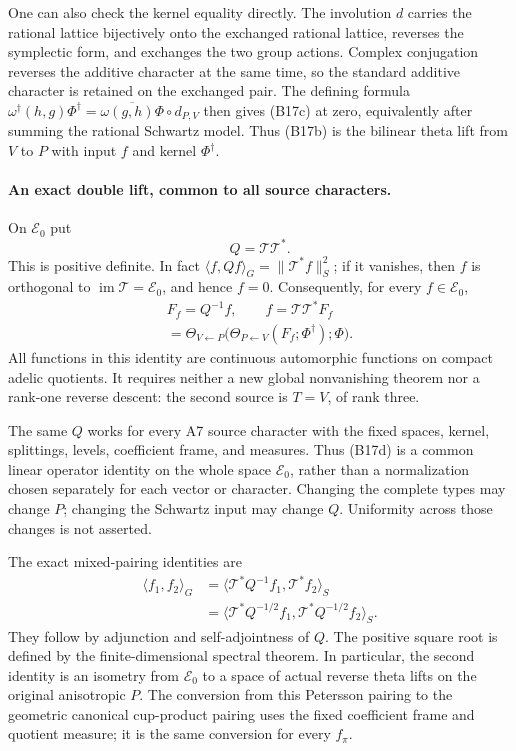 One can also check the kernel equality directly. The involution
$d$ carries the rational lattice bijectively onto the exchanged
rational lattice, reverses the symplectic form, and exchanges
the two group actions. Complex conjugation reverses the additive
character at the same time, so the standard additive character
is retained on the exchanged pair. The defining formula
$\omega^\dagger(h,g)\Phi^\dagger
 =\overline{\omega(g,h)\Phi}\circ d_{P,V}$
then gives (B17c) at zero, equivalently after summing the
rational Schwartz model. Thus (B17b) is the bilinear theta lift
from $V$ to $P$ with input $f$ and kernel $\Phi^\dagger$.

\paragraph{An exact double lift, common to all source characters.}
On $\mathcal E_0$ put
\[
 Q=\mathcal T\mathcal T^*.
\]
This is positive definite. In fact
$\langle f,Qf\rangle_G=\|\mathcal T^*f\|_S^2$;
if it vanishes, then $f$ is orthogonal to
$\operatorname{im}\mathcal T=\mathcal E_0$, and hence $f=0$.
Consequently, for every $f\in\mathcal E_0$,
\begin{equation}
\begin{gathered}
 F_f=Q^{-1}f,\qquad
 f=\mathcal T\mathcal T^*F_f\\
   =\Theta_{V\leftarrow P}
          \bigl(\Theta_{P\leftarrow V}(F_f;\Phi^\dagger);
                \Phi\bigr).
\end{gathered}
\tag{B17d}
\end{equation}
All functions in this identity are continuous automorphic
functions on compact adelic quotients. It requires neither a new
global nonvanishing theorem nor a rank-one reverse descent:
the second source is $T=V$, of rank three.

The same $Q$ works for every A7 source character with the fixed
spaces, kernel, splittings, levels, coefficient frame, and
measures. Thus (B17d) is a common linear operator identity on the
whole space $\mathcal E_0$, rather than a normalization chosen
separately for each vector or character. Changing the complete
types may change $P$; changing the Schwartz input may change
$Q$. Uniformity across those changes is not asserted.

The exact mixed-pairing identities are
\begin{equation}
\begin{aligned}
 \langle f_1,f_2\rangle_G
    &=\langle\mathcal T^*Q^{-1}f_1,
                        \mathcal T^*f_2\rangle_S\\
    &=\langle\mathcal T^*Q^{-1/2}f_1,
                        \mathcal T^*Q^{-1/2}f_2\rangle_S .
\end{aligned}
\tag{B17e}
\end{equation}
They follow by adjunction and self-adjointness of $Q$.
The positive square root is defined by the finite-dimensional
spectral theorem. In particular, the second identity is an
isometry from $\mathcal E_0$ to a space of actual reverse theta
lifts on the original anisotropic $P$. The conversion from this
Petersson pairing to the geometric canonical cup-product
pairing uses the fixed coefficient frame and quotient measure;
it is the same conversion for every $f_\pi$.

